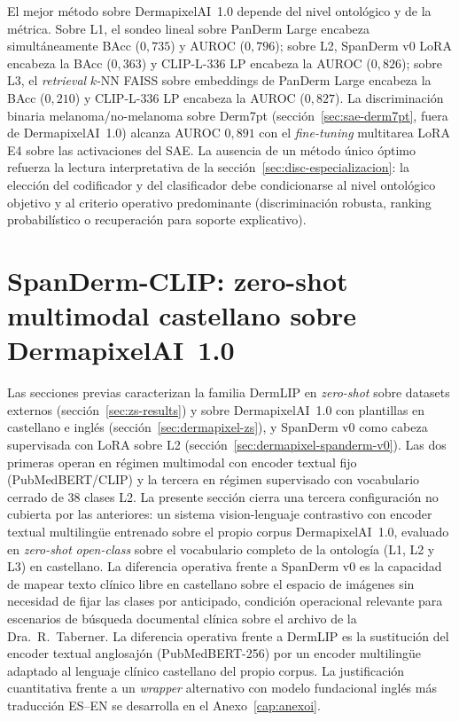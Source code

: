 El mejor método sobre DermapixelAI~1.0 depende del nivel
ontológico y de la métrica. Sobre L1, el sondeo lineal sobre
PanDerm Large encabeza simultáneamente BAcc ($0{,}735$) y
AUROC ($0{,}796$); sobre L2, SpanDerm v0 LoRA encabeza la BAcc
($0{,}363$) y CLIP-L-336 LP encabeza la AUROC ($0{,}826$); sobre
L3, el \emph{retrieval} $k$-NN FAISS sobre embeddings de PanDerm
Large encabeza la BAcc ($0{,}210$) y CLIP-L-336 LP encabeza la
AUROC ($0{,}827$). La discriminación binaria melanoma/no-melanoma
sobre Derm7pt (secci\'on~\ref{sec:sae-derm7pt}, fuera de
DermapixelAI~1.0) alcanza AUROC $0{,}891$ con el \emph{fine-tuning}
multitarea LoRA E4 sobre las activaciones del SAE. La ausencia de
un método único óptimo refuerza la lectura interpretativa de la
secci\'on~\ref{sec:disc-especializacion}: la elección del
codificador y del clasificador debe condicionarse al nivel
ontológico objetivo y al criterio operativo predominante
(discriminación robusta, ranking probabilístico o recuperación
para soporte explicativo).

\section{SpanDerm-CLIP: zero-shot multimodal castellano sobre
DermapixelAI~1.0}
\label{sec:spanderm-clip}

Las secciones previas caracterizan la familia DermLIP en
\emph{zero-shot} sobre datasets externos
(secci\'on~\ref{sec:zs-results}) y sobre DermapixelAI~1.0 con
plantillas en castellano e inglés
(secci\'on~\ref{sec:dermapixel-zs}), y SpanDerm v0 como cabeza
supervisada con LoRA sobre L2
(secci\'on~\ref{sec:dermapixel-spanderm-v0}). Las dos primeras
operan en régimen multimodal con encoder textual fijo
(PubMedBERT/CLIP) y la tercera en régimen supervisado con
vocabulario cerrado de $38$ clases L2. La presente sección
cierra una tercera configuración no cubierta por las anteriores:
un sistema vision-lenguaje contrastivo con encoder textual
multilingüe entrenado sobre el propio corpus DermapixelAI~1.0,
evaluado en \emph{zero-shot} \emph{open-class} sobre el vocabulario
completo de la ontología (L1, L2 y L3) en castellano. La
diferencia operativa frente a SpanDerm v0 es la capacidad de
mapear texto clínico libre en castellano sobre el espacio de
imágenes sin necesidad de fijar las clases por anticipado, condición
operacional relevante para escenarios de búsqueda
documental clínica sobre el archivo de la Dra.~R.~Taberner. La
diferencia operativa frente a DermLIP es la sustitución del encoder
textual anglosajón (PubMedBERT-256) por un encoder multilingüe
adaptado al lenguaje clínico castellano del propio corpus. La
justificación cuantitativa frente a un \emph{wrapper} alternativo
con modelo fundacional inglés más traducción ES--EN se desarrolla
en el Anexo~\ref{cap:anexoi}.

